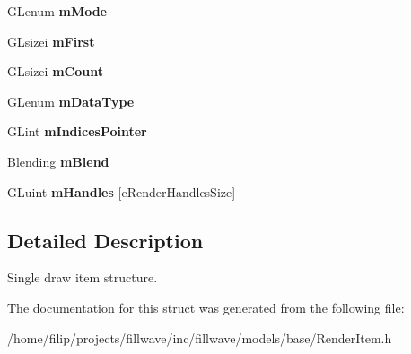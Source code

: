 \begin{DoxyCompactItemize}
\begin{tabbing}
\end{tabbing}\item 
\mbox{\label{structflw_1_1flf_1_1RenderItem_a4e7932d1ecf952ceb556aeccf311178a}} 
G\+Lenum {\bfseries m\+Mode}
\item 
\mbox{\label{structflw_1_1flf_1_1RenderItem_a17b5fabb005ace813c2514cf5c50fcfa}} 
G\+Lsizei {\bfseries m\+First}
\item 
\mbox{\label{structflw_1_1flf_1_1RenderItem_a925ea582099a60e28adc726f286d1e20}} 
G\+Lsizei {\bfseries m\+Count}
\item 
\mbox{\label{structflw_1_1flf_1_1RenderItem_a0f2abbeab716701b3e34ff0093bb31bc}} 
G\+Lenum {\bfseries m\+Data\+Type}
\item 
\mbox{\label{structflw_1_1flf_1_1RenderItem_a03ee83918a408f0b8358396b3e25a2c9}} 
G\+Lint {\bfseries m\+Indices\+Pointer}
\item 
\mbox{\label{structflw_1_1flf_1_1RenderItem_a6418a83fa0555f4ea35bd5b0a0c1c113}} 
\hyperlink{structflw_1_1flf_1_1Blending}{Blending} {\bfseries m\+Blend}
\item 
\mbox{\label{structflw_1_1flf_1_1RenderItem_ad1b5e8cf568c099ebefd386b1965e385}} 
G\+Luint {\bfseries m\+Handles} \mbox{[}e\+Render\+Handles\+Size\mbox{]}
\end{DoxyCompactItemize}


\subsection{Detailed Description}
Single draw item structure. 

The documentation for this struct was generated from the following file\+:\begin{DoxyCompactItemize}
\item 
/home/filip/projects/fillwave/inc/fillwave/models/base/Render\+Item.\+h\end{DoxyCompactItemize}
